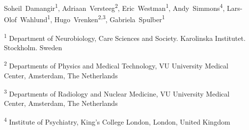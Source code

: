 Soheil~Damangir\textsuperscript{1}, 
Adriaan~Versteeg\textsuperscript{2}, 
Eric~Westman\textsuperscript{1}, 
Andy~Simmons\textsuperscript{4}, 
Lars-Olof~Wahlund\textsuperscript{1}, 
Hugo~Vrenken\textsuperscript{2,3}, 
Gabriela~Spulber\textsuperscript{1}

\textsuperscript{1} Department of Neurobiology, Care Sciences and Society. Karolinska Institutet. Stockholm. Sweden

\textsuperscript{2} Departments of Physics and Medical Technology, VU University Medical Center, Amsterdam, The Netherlands

\textsuperscript{3} Departments of Radiology and Nuclear Medicine, VU University Medical Center, Amsterdam, The Netherlands

\textsuperscript{4} Institute of Psychiatry, King's College London, London, United Kingdom
  
  
  
  
  
  
  
  
  